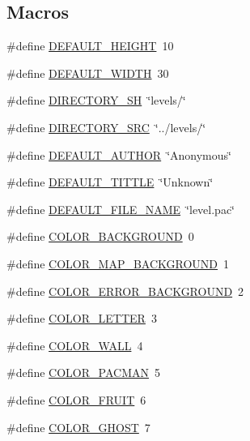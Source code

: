 \subsection*{Macros}
\begin{DoxyCompactItemize}
\item 
\#define \hyperlink{pacman-level-editor_8c_a1879f9e5604a01f0983829846001ab23}{D\-E\-F\-A\-U\-L\-T\-\_\-\-H\-E\-I\-G\-H\-T}~10
\item 
\#define \hyperlink{pacman-level-editor_8c_a93493eb8fae5549bd5be67f3449245e0}{D\-E\-F\-A\-U\-L\-T\-\_\-\-W\-I\-D\-T\-H}~30
\item 
\#define \hyperlink{pacman-level-editor_8c_a7a602a4376595097bdde82a739d7fc9c}{D\-I\-R\-E\-C\-T\-O\-R\-Y\-\_\-\-S\-H}~\char`\"{}levels/\char`\"{}
\item 
\#define \hyperlink{pacman-level-editor_8c_a680ab63d028a68a793615c14b807244e}{D\-I\-R\-E\-C\-T\-O\-R\-Y\-\_\-\-S\-R\-C}~\char`\"{}../levels/\char`\"{}
\item 
\#define \hyperlink{pacman-level-editor_8c_a0df6a4797ddf20bd10851daf8ba3e223}{D\-E\-F\-A\-U\-L\-T\-\_\-\-A\-U\-T\-H\-O\-R}~\char`\"{}Anonymous\char`\"{}
\item 
\#define \hyperlink{pacman-level-editor_8c_ae18ca9554768c8cc98f2a8f3212936c7}{D\-E\-F\-A\-U\-L\-T\-\_\-\-T\-I\-T\-T\-L\-E}~\char`\"{}Unknown\char`\"{}
\item 
\#define \hyperlink{pacman-level-editor_8c_ad7a970fb49d2ff723bbd67b86ba3b443}{D\-E\-F\-A\-U\-L\-T\-\_\-\-F\-I\-L\-E\-\_\-\-N\-A\-M\-E}~\char`\"{}level.\-pac\char`\"{}
\item 
\#define \hyperlink{pacman-level-editor_8c_af27cfac70191e90ee59f2fbfc0142df5}{C\-O\-L\-O\-R\-\_\-\-B\-A\-C\-K\-G\-R\-O\-U\-N\-D}~0
\item 
\#define \hyperlink{pacman-level-editor_8c_aa0c3931283632f3b28ad3ab6fe6d7ffb}{C\-O\-L\-O\-R\-\_\-\-M\-A\-P\-\_\-\-B\-A\-C\-K\-G\-R\-O\-U\-N\-D}~1
\item 
\#define \hyperlink{pacman-level-editor_8c_a74d87509e98e202c778b5a9e4ae89f09}{C\-O\-L\-O\-R\-\_\-\-E\-R\-R\-O\-R\-\_\-\-B\-A\-C\-K\-G\-R\-O\-U\-N\-D}~2
\item 
\#define \hyperlink{pacman-level-editor_8c_ab604bbfe7359083e9abc00907e8acb12}{C\-O\-L\-O\-R\-\_\-\-L\-E\-T\-T\-E\-R}~3
\item 
\#define \hyperlink{pacman-level-editor_8c_a528521b4019fe0dbc561165851660df5}{C\-O\-L\-O\-R\-\_\-\-W\-A\-L\-L}~4
\item 
\#define \hyperlink{pacman-level-editor_8c_a977b7c2763deb11541bc962426297045}{C\-O\-L\-O\-R\-\_\-\-P\-A\-C\-M\-A\-N}~5
\item 
\#define \hyperlink{pacman-level-editor_8c_aa621edd711419dc69326010aabdb01bb}{C\-O\-L\-O\-R\-\_\-\-F\-R\-U\-I\-T}~6
\item 
\#define \hyperlink{pacman-level-editor_8c_a4dff2b6100530a45e7c3b38c9484f454}{C\-O\-L\-O\-R\-\_\-\-G\-H\-O\-S\-T}~7
\end{DoxyCompactItemize}
